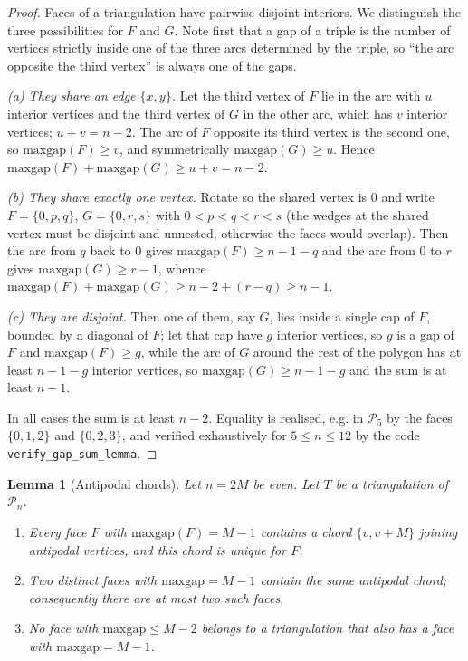 \documentclass[11pt,a4paper]{article}
\newtheorem{lemma}[theorem]{Lemma}
\theoremstyle{definition}
\newcommand{\Pol}{\mathcal{P}}
\newcommand{\maxgap}{\mathrm{maxgap}}
\begin{document}
\begin{proof}
Faces of a triangulation have pairwise disjoint interiors. We distinguish the
three possibilities for $F$ and $G$. Note first that a gap of a triple is the
number of vertices strictly inside one of the three arcs determined by the
triple, so ``the arc opposite the third vertex'' is always one of the gaps.

\emph{(a) They share an edge $\{x, y\}$.} Let the third vertex of $F$ lie in the
arc with $u$ interior vertices and the third vertex of $G$ in the other arc, which
has $v$ interior vertices; $u + v = n - 2$. The arc of $F$ opposite its third
vertex is the second one, so $\maxgap(F) \ge v$, and symmetrically
$\maxgap(G) \ge u$. Hence $\maxgap(F) + \maxgap(G) \ge u + v = n-2$.

\emph{(b) They share exactly one vertex.} Rotate so the shared vertex is $0$ and
write $F = \{0, p, q\}$, $G = \{0, r, s\}$ with $0 < p < q < r < s$ (the wedges at
the shared vertex must be disjoint and unnested, otherwise the faces would
overlap). Then the arc from $q$ back to $0$ gives $\maxgap(F) \ge n-1-q$ and the
arc from $0$ to $r$ gives $\maxgap(G) \ge r - 1$, whence
$\maxgap(F) + \maxgap(G) \ge n - 2 + (r - q) \ge n-1$.

\emph{(c) They are disjoint.} Then one of them, say $G$, lies inside a single cap
of $F$, bounded by a diagonal of $F$; let that cap have $g$ interior vertices,
so $g$ is a gap of $F$ and $\maxgap(F) \ge g$, while the arc of $G$ around the
rest of the polygon has at least $n - 1 - g$ interior vertices, so
$\maxgap(G) \ge n - 1 - g$ and the sum is at least $n-1$.

In all cases the sum is at least $n-2$. Equality is realised, e.g. in $\Pol_5$ by
the faces $\{0,1,2\}$ and $\{0,2,3\}$, and verified exhaustively for $5 \le n
\le 12$ by the code \texttt{verify\_gap\_sum\_lemma}.
\end{proof}

\begin{lemma}[Antipodal chords]\label{lem:antipodal}
Let $n = 2M$ be even. Let $T$ be a triangulation of $\Pol_n$.
\begin{enumerate}[label=(\roman*)]
\item Every face $F$ with $\maxgap(F) = M-1$ contains a chord $\{v, v+M\}$
      joining antipodal vertices, and this chord is unique for $F$.
\item Two distinct faces with $\maxgap = M-1$ contain the same antipodal chord;
      consequently there are at most two such faces.
\item No face with $\maxgap \le M-2$ belongs to a triangulation that also has a
      face with $\maxgap = M - 1$.
\end{enumerate}
\end{lemma}
\end{document}
